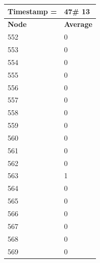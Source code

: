 \begin{tabular}{|l||l|}
\hline
\textbf{Timestamp =} & \textbf{47}\# 13\\\hline
	\textbf{Node} & \textbf{Average} \\ \hline
\hline
	552 & 0 \\ \hline
	553 & 0 \\ \hline
	554 & 0 \\ \hline
	555 & 0 \\ \hline
	556 & 0 \\ \hline
	557 & 0 \\ \hline
	558 & 0 \\ \hline
	559 & 0 \\ \hline
	560 & 0 \\ \hline
	561 & 0 \\ \hline
	562 & 0 \\ \hline
	563 & 1 \\ \hline
	564 & 0 \\ \hline
	565 & 0 \\ \hline
	566 & 0 \\ \hline
	567 & 0 \\ \hline
	568 & 0 \\ \hline
	569 & 0 \\ \hline
\end{tabular}

